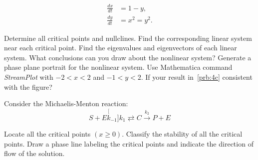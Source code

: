 \documentclass[
    number={7},
]{math486homework}
\begin{document}
\begin{problems}
\begin{equation*}
    \begin{aligned}
       \frac{dx}{dt} &= 1 - y,\\
       \frac{dy}{dt} &= x^{2} = y^{2}.
    \end{aligned}
    \end{equation*}
    \begin{problems}
       \subproblem Determine all critical points and nullclines. 
       \subproblem Find the corresponding linear system near each critical point. 
       \subproblem Find the eigenvalues and eigenvectors of each linear system.
       What conclusions can you draw about the nonlinear system? 
       \subproblem Generate a phase plane portrait for the nonlinear system.
       Use Mathematica command \textit{StreamPlot} with $-2 < x < 2$ and $-1 < y < 2$. 
       If your result in~\ref{prb:4c} consistent with the figure?
    \end{problems}
    \problem Consider the Michaelis-Menton reaction:
    \[ S + E \stackrel[k_{-1}]{k_{1}}{\rightleftarrows} C \stackrel{k_{2}}{\rightarrow} P + E \]
    \begin{problems}
       \subproblem Locate all the critical points $(x \geq 0)$. 
       \subproblem Classify the stability of all the critical points. 
       \subproblem Draw a phase line labeling the critical points and indicate the direction of flow of the solution. 
    \end{problems}
\end{problems}
\end{document}
